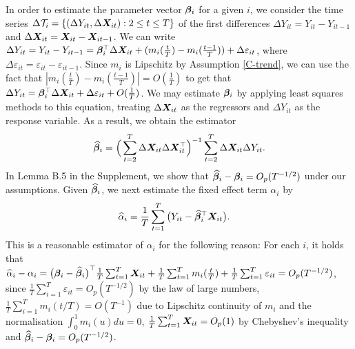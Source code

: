 \documentclass[12pt]{article}
\begin{document}
In order to estimate the parameter vector $\bm{\beta}_i$ for a given $i$, we consider the time series $\Delta \mathcal{T}_i = \{(\Delta Y_{it}, \Delta \boldsymbol{X}_{it}): 2 \leq t \leq T\}$ of the first differences $\Delta Y_{it} = Y_{it} - Y_{i t-1}$ and $\Delta  \boldsymbol{X}_{it} =  \boldsymbol{X}_{it} - \boldsymbol{X}_{it-1}$. We can write $\Delta Y_{it} = Y_{it} - Y_{i t-1} =\bm{\beta}_i^\top \Delta \boldsymbol{X}_{it} + (m_i (\frac{t}{T}) - m_i (\frac{t-1}{T})) + \Delta \varepsilon_{it}$, where $ \Delta \varepsilon_{it} = \varepsilon_{it} - \varepsilon_{i t-1}$. Since $m_i$ is Lipschitz by Assumption \ref{C-trend}, we can use the fact that $ |m_i ( \frac{t}{T} ) - m_i (\frac{t-1}{T}) | = O(\frac{1}{T})$ to get that $\Delta Y_{it} = \bm{\beta}_i^\top \Delta \boldsymbol{X}_{it} + \Delta \varepsilon_{it} + O(\frac{1}{T})$. We may estimate $\bm{\beta}_i$ by applying least squares methods to this equation, treating $\Delta \boldsymbol{X}_{it}$ as the regressors and $\Delta Y_{it}$ as the response variable. As a result, we obtain the estimator
\begin{align}\label{eq:beta:est}
\widehat{\bm{\beta}}_i = \Big( \sum_{t=2}^T \Delta \boldsymbol{X}_{it} \Delta \boldsymbol{X}_{it}^\top \Big)^{-1} \sum_{t=2}^T \Delta \boldsymbol{X}_{it} \Delta Y_{it}.
\end{align}
In Lemma B.5 %
in the Supplement, we show that $\widehat{\bm{\beta}}_i - \bm{\beta}_i = O_p(T^{-1/2})$ under our assumptions. Given $\widehat{\bm{\beta}}_i$, we next estimate the fixed effect term $\alpha_i$ by 
\begin{align}\label{eq:alpha:est}
\widehat{\alpha}_i &= \frac{1}{T}\sum_{t=1}^T \big(Y_{it} - \widehat{\bm{\beta}}_i^\top \boldsymbol{X}_{it}\big). 
\end{align}
This is a reasonable estimator of $\alpha_i$ for the following reason: For each $i$, it holds that $\widehat{\alpha}_i - \alpha_i = \big(\bm{\beta}_i - \widehat{\bm{\beta}}_i \big)^\top\frac{1}{T}\sum_{t=1}^T  \boldsymbol{X}_{it} + \frac{1}{T}\sum_{t=1}^T m_i(\frac{t}{T}) + \frac{1}{T}\sum_{t=1}^T \varepsilon_{it} = O_p(T^{-1/2})$, since $\frac{1}{T}\sum_{i=1}^T \varepsilon_{it} = O_p(T^{-1/2})$ by the law of large numbers, $\frac{1}{T}\sum_{i=1}^T m_i(t/T) = O(T^{-1})$ due to Lipschitz continuity of $m_i$ and the normalisation $\int_{0}^1 m_i(u)du = 0$, $\frac{1}{T}\sum_{t=1}^T  \boldsymbol{X}_{it} = O_p(1)$ by Chebyshev's inequality and $\widehat{\bm{\beta}}_i - \bm{\beta}_i = O_p (T^{-1/2})$. 
\end{document}
